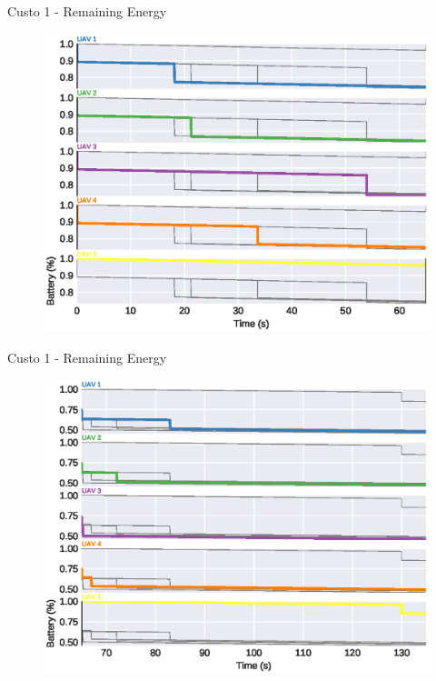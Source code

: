\begin{frame}{Custo 1 - Remaining Energy}
                    \begin{figure}[!htb]
                        \includegraphics[width=\textwidth]{custo_1/uav_remaining_energy_65.eps}
                    \end{figure}
                \end{frame}\begin{frame}{Custo 1 - Remaining Energy}
                    \begin{figure}[!htb]
                        \includegraphics[width=\textwidth]{custo_1/uav_remaining_energy_135.eps}
                    \end{figure}

\end{frame}
